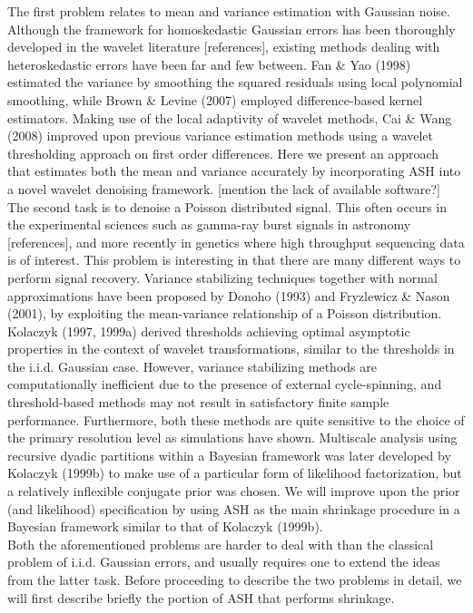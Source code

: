 \documentclass[12pt]{article}
\begin{document}
The first problem relates to mean and variance estimation with Gaussian noise. Although the framework for homoskedastic Gaussian errors has been thoroughly developed in the wavelet literature [references], existing methods dealing with heteroskedastic errors have been far and few between. Fan \& Yao (1998) estimated the variance by smoothing the squared residuals using local polynomial smoothing, while Brown \& Levine (2007) employed difference-based kernel estimators. Making use of the local adaptivity of wavelet methods, Cai \& Wang (2008) improved upon previous variance estimation methods using a wavelet thresholding approach on first order differences. Here we present an approach that estimates both the mean and variance accurately by incorporating ASH into a novel wavelet denoising framework. [mention the lack of available software?]\bigskip\\
The second task is to denoise a Poisson distributed signal. This often occurs in the experimental sciences such as gamma-ray burst signals in astronomy [references], and more recently in genetics where high throughput sequencing data is of interest. This problem is interesting in that there are many different ways to perform signal recovery. Variance stabilizing techniques together with normal approximations have been proposed by Donoho (1993) and Fryzlewicz \& Nason (2001), by exploiting the mean-variance relationship of a Poisson distribution. Kolaczyk (1997, 1999a) derived thresholds achieving optimal asymptotic properties in the context of wavelet transformations, similar to the thresholds in the i.i.d. Gaussian case.  However, variance stabilizing methods are computationally inefficient due to the presence of external cycle-spinning, and threshold-based methods may not result in satisfactory finite sample performance. Furthermore, both these methods are quite sensitive to the choice of the primary resolution level as simulations have shown. Multiscale analysis using recursive dyadic partitions within a Bayesian framework was later developed by Kolaczyk (1999b) to make use of a particular form of likelihood factorization, but a relatively inflexible conjugate prior was chosen. We will improve upon the prior (and likelihood) specification by using ASH as the main shrinkage procedure in a Bayesian framework similar to that of Kolaczyk (1999b). \bigskip\\
Both the aforementioned problems are harder to deal with than the classical problem of i.i.d. Gaussian errors, and usually requires one to extend the ideas from the latter task. Before proceeding to describe the two problems in detail, we will first describe briefly the portion of ASH that performs shrinkage. \bigskip\\
\end{document}
